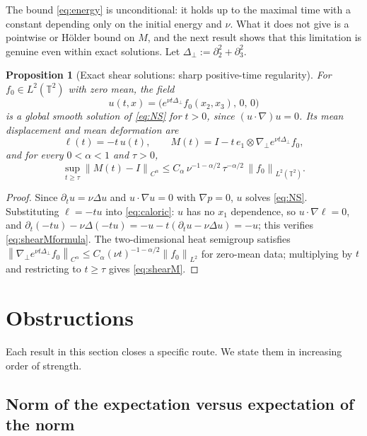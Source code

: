 \documentclass[11pt,reqno]{amsart}
\newcommand{\T}{\mathbb{T}}
\newcommand{\norm}[1]{\left\lVert #1\right\rVert}
\newtheorem{proposition}[theorem]{Proposition}
\theoremstyle{definition}
\begin{document}
The bound \eqref{eq:energy} is unconditional: it holds up to the maximal time with a
constant depending only on the initial energy and $\nu$. What it does not give is a
pointwise or H\"older bound on $M$, and the next result shows that this limitation is
genuine even within exact solutions. Let $\Delta_\perp:=\partial_2^2+\partial_3^2$.

\begin{proposition}[Exact shear solutions: sharp positive-time regularity]\label{prop:shearM}
For $f_0\in L^2(\T^2)$ with zero mean, the field
\[
  u(t,x)=\bigl(e^{\nu t\Delta_\perp}f_0(x_2,x_3),\,0,\,0\bigr)
\]
is a global smooth solution of \eqref{eq:NS} for $t>0$, since $(u\cdot\nabla)u=0$. Its
mean displacement and mean deformation are
\begin{equation}\label{eq:shearMformula}
  \ell(t)=-t\,u(t),\qquad
  M(t)=I-t\,e_1\otimes\nabla_\perp e^{\nu t\Delta_\perp}f_0 ,
\end{equation}
and for every $0<\alpha<1$ and $\tau>0$,
\begin{equation}\label{eq:shearM}
  \sup_{t\ge\tau}\norm{M(t)-I}_{C^\alpha}
  \le C_\alpha\,\nu^{-1-\alpha/2}\,\tau^{-\alpha/2}\,\norm{f_0}_{L^2(\T^2)} .
\end{equation}
\end{proposition}

\begin{proof}
Since $\partial_tu=\nu\Delta u$ and $u\cdot\nabla u=0$ with $\nabla p=0$, $u$ solves
\eqref{eq:NS}. Substituting $\ell=-tu$ into \eqref{eq:caloric}: $u$ has no $x_1$
dependence, so $u\cdot\nabla\ell=0$, and
$\partial_t(-tu)-\nu\Delta(-tu)=-u-t(\partial_tu-\nu\Delta u)=-u$; this verifies
\eqref{eq:shearMformula}. The two-dimensional heat semigroup satisfies
$\norm{\nabla_\perp e^{\nu t\Delta_\perp}f_0}_{C^\alpha}
\le C_\alpha(\nu t)^{-1-\alpha/2}\norm{f_0}_{L^2}$ for zero-mean data; multiplying by $t$
and restricting to $t\ge\tau$ gives \eqref{eq:shearM}.
\end{proof}

\section{Obstructions}\label{sec:obstr}

Each result in this section closes a specific route. We state them in increasing order of
strength.

\subsection{Norm of the expectation versus expectation of the norm}
\end{document}
